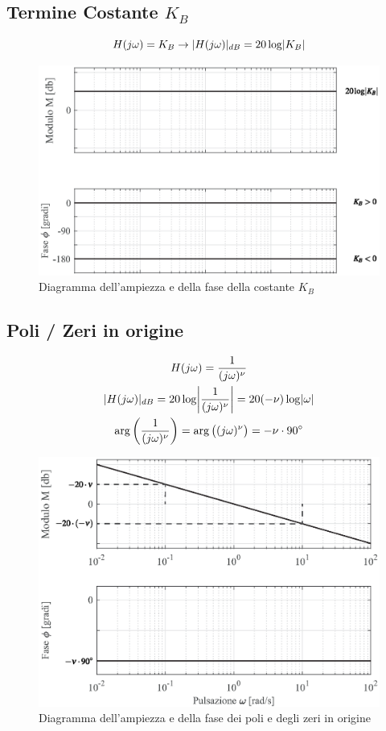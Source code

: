 \subsection{Termine Costante $ K_B $} 
\[ H(j\omega) = K_B \rightarrow \lvert H(j\omega)\rvert_{dB} = 20 \log \lvert K_B\rvert \]
\begin{figure}[H]
	\centering
	\includegraphics[width=0.7\linewidth]{immagini/cap6_Bode/bodeCost}
	\caption{ Diagramma dell'ampiezza e della fase della costante $  K_B $ }
	\label{fig:bodeCost}
\end{figure}

\subsection{Poli / Zeri in origine}

\begin{gather*}
	H(j\omega) = \frac{1}{(j\omega)^\nu}\\
	\abs{H(j\omega)}_{dB} = 20 \log \Abs{\frac{1}{(j\omega)^\nu}} = 20 ( -\nu) \log \abs{\omega} \\
	\arg \bigg(\frac{1}{(j\omega)^\nu}\bigg) = \arg \big((j\omega)^{\nu}\big) = -\nu \cdot \ang{90} 
\end{gather*}

\begin{figure}[H]
	\centering
	\includegraphics[width=0.7\linewidth]{immagini/cap6_Bode/bodeZPOrig}
	\caption{ Diagramma dell'ampiezza e della fase dei poli e degli zeri in origine}
	\label{fig:bodeZPOrig}
\end{figure}


